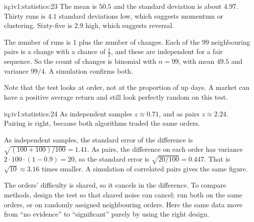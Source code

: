 \begin{solution}{iq:iv1:statistics:23}
The mean is $50.5$ and the standard deviation is about $4.97$. Thirty runs is $4.1$ standard deviations low, which suggests momentum or clustering. Sixty-five is $2.9$ high, which suggests reversal.

The number of runs is 1 plus the number of changes. Each of the 99 neighbouring pairs is a change with a chance of $\tfrac12$, and these are independent for a fair sequence. So the count of changes is binomial with $n = 99$, with mean $49.5$ and variance $99/4$. A simulation confirms both.

Note that the test looks at order, not at the proportion of up days. A market can have a positive average return and still look perfectly random on this test.

\end{solution}

\begin{solution}{iq:iv1:statistics:24}
As independent samples $z \approx 0.71$, and as pairs $z \approx 2.24$. Pairing is right, because both algorithms traded the same orders.

As independent samples, the standard error of the difference is $\sqrt{(100 + 100)/100} = 1.41$. As pairs, the difference on each order has variance $2 \cdot 100 \cdot (1 - 0.9) = 20$, so the standard error is $\sqrt{20/100} = 0.447$. That is $\sqrt{10} \approx 3.16$ times smaller. A simulation of correlated pairs gives the same figure.

The orders' difficulty is shared, so it cancels in the difference. To compare methods, design the test so that shared noise can cancel: run both on the same orders, or on randomly assigned neighbouring orders. Here the same data move from ``no evidence'' to ``significant'' purely by using the right design.

\end{solution}

